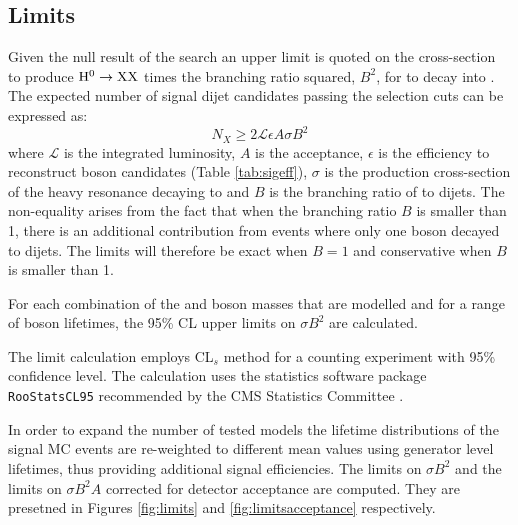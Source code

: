 \subsection{Limits}
\label{subsec:limits}

Given the null result of the search an upper limit is quoted on the cross-section 
to produce $\mathrm{H}^{0}\rightarrow \mathrm{X}\mathrm{X}$ times the branching ratio squared, $B^2$, for \X to decay into \qq. 
The expected number of signal dijet candidates passing the selection cuts can be expressed as:
\begin{equation}
N_X \geq 2 \mathcal{L}\epsilon A\sigma B^2
\end{equation}
where $\mathcal{L}$ is the integrated luminosity, $A$ is the acceptance,
 $\epsilon$ is the efficiency to reconstruct \X boson candidates
(Table \ref{tab:sigeff}), $\sigma$ is the production cross-section of the heavy resonance decaying to \XX and 
$B$ is the branching ratio of \X to dijets. The non-equality arises from the fact that when the branching ratio $B$
is smaller than 1, there is an additional contribution from events where only one \X boson decayed to dijets. 
The limits will therefore be exact when $B=1$ and conservative when $B$ is smaller than 1.
 

For each combination of the \Higgs and \X boson masses that are modelled and for a range of \X boson lifetimes,
the 95\% CL upper limits on $\sigma B^2$ are calculated.
  
 The limit calculation employs CL$_s$ method \cite{Read:2002hq} for a counting
experiment with 95\% confidence level. The calculation uses the statistics software 
package {\tt RooStatsCL95} recommended by
 the CMS Statistics Committee \cite{RooStatsCL95}. 

In order to expand the number of tested models
the lifetime distributions of the signal MC events are re-weighted to different
mean values using generator level lifetimes, thus providing additional signal efficiencies. 
The limits on $\sigma B^2$ and the limits on $\sigma B^2 A$ corrected for detector acceptance are computed. 
They are presetned in Figures
\ref{fig:limits} and \ref{fig:limitsacceptance} respectively.

